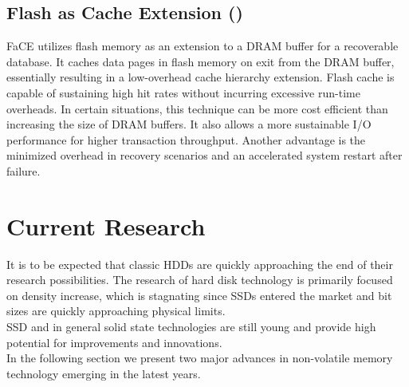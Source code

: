\documentclass{acm_proc_article-sp}
\begin{document}
\subsection{Flash as Cache Extension ()}
FaCE \cite{kang2012flash} utilizes flash memory as an extension to a DRAM buffer for a recoverable database. It caches data pages in flash memory on exit from the DRAM buffer, essentially resulting in a low-overhead cache hierarchy extension. Flash cache is capable of sustaining high hit rates without incurring excessive run-time overheads. In certain situations, this technique can be more cost efficient than increasing the size of DRAM buffers. It also allows a more sustainable I/O performance for higher transaction throughput. Another advantage is the minimized overhead in recovery scenarios and an accelerated system restart after failure.

\section{Current Research}
It is to be expected that classic HDDs are quickly approaching the end of their research possibilities. The research of hard disk technology is primarily focused on density increase, which is stagnating since SSDs entered the market and bit sizes are quickly approaching physical limits.
\\
SSD and in general solid state technologies are still young and provide high potential for improvements and innovations.
\\
In the following section we present two major advances in non-volatile memory technology emerging in the latest years.
\end{document}

